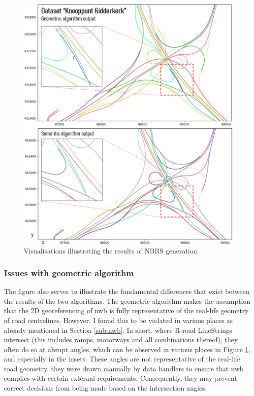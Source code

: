 \begin{figure}
    \centering
    \includegraphics[width=\linewidth]{final_report/figs/nbrsgeneration0.png}
    \caption{Visualisations illustrating the results of NBRS generation.}
    \label{fig:nbrsgeneration0}
\end{figure}

\subsubsection{Issues with geometric algorithm}

The figure also serves to illustrate the fundamental differences that exist between the results of the two algorithms. The geometric algorithm makes the assumption that the 2D georeferencing of \ac{nwb} is fully representative of the real-life geometry of road centrelines. However, I found this to be violated in various places as already mentioned in Section \ref{sub:nwb}. In short, where R-road LineStrings intersect (this includes ramps, motorways and all combinations thereof), they often do so at abrupt angles, which can be observed in various places in Figure \ref{fig:nbrsgeneration0}, and especially in the insets. These angles are not representative of the real-life road geometry, they were drawn manually by data handlers to ensure that \ac{nwb} complies with certain external requirements. Consequently, they may prevent correct decisions from being made based on the intersection angles.

